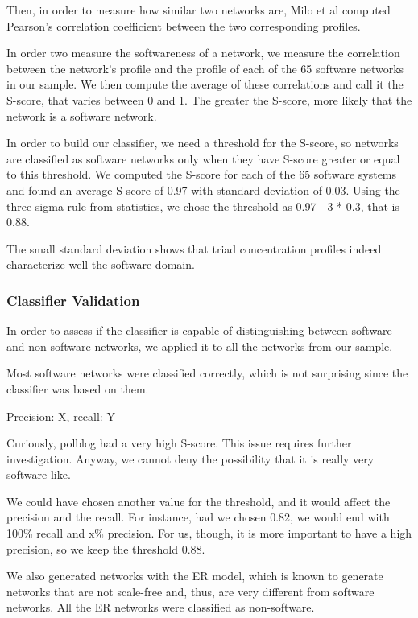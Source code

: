 Then, in order to measure how similar two networks are, Milo et al computed
Pearson's correlation coefficient between the two corresponding profiles.

In order two measure the softwareness of a network, we measure the correlation
between the network's profile and the profile of each of the 65 software
networks in our sample. We then compute the average of these correlations and
call it the S-score, that varies between 0 and 1. The greater the S-score, more
likely that the network is a software network.

In order to build our classifier, we need a threshold for the S-score, so
networks are classified as software networks only when they have S-score greater
or equal to this threshold. We computed the S-score for each of the 65 software
systems and found an average S-score of 0.97 with standard deviation of 0.03.
Using the three-sigma rule from statistics, we chose the threshold as 0.97 - 3 *
0.3, that is 0.88. 

The small standard deviation shows that triad concentration profiles indeed
characterize well the software domain.

\subsubsection{Classifier Validation}

In order to assess if the classifier is capable of distinguishing between
software and non-software networks, we applied it to all the networks from our
sample. 

Most software networks were classified correctly, which is not surprising since
the classifier was based on them.

Precision: X, recall: Y

Curiously, polblog had a very high S-score. This issue requires further 
investigation. Anyway, we cannot deny the possibility that it is really very
software-like.

We could have chosen another value for the threshold, and it would affect the
precision and the recall. For instance, had we chosen 0.82, we would end with
100\% recall and x\% precision. For us, though, it is more important to have a
high precision, so we keep the threshold 0.88.

We also generated networks with the ER model, which is known to generate
networks that are not scale-free and, thus, are very different from software
networks. All the ER networks were classified as non-software.

